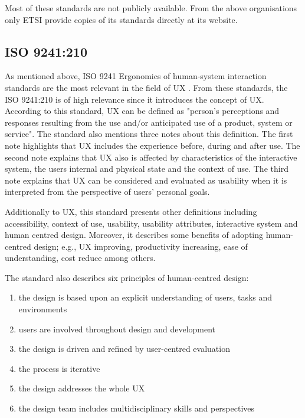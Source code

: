 Most of these standards are not publicly available. From the above organisations only \ac{ETSI} provide copies of its standards directly at its website.

\subsection{ISO 9241:210}
As mentioned above, ISO 9241 Ergonomics of human-system interaction standards are the most relevant in the field of \ac{UX} \autocite{Ran2015}. From these standards, the ISO 9241:210 \autocite{iso9241:210} is of high relevance since it introduces the concept of \ac{UX}. According to this standard, \ac{UX} can be defined as "person's perceptions and responses resulting from the use and/or anticipated use of a product, system or service". The standard also mentions three notes about this definition. The first note highlights that \ac{UX} includes the experience before, during and after use. The second note explains that \ac{UX} also is affected by characteristics of the interactive system, the users internal and physical state and the context of use. The third note explains that \ac{UX} can be considered and evaluated as usability when it is interpreted from the perspective of users' personal goals.

Additionally to \ac{UX}, this standard presents other definitions including accessibility, context of use, usability, usability attributes, interactive system and human centred design. Moreover, it describes some benefits of adopting human-centred design; e.g., \ac{UX} improving, productivity increasing, ease of understanding, cost reduce among others.

The standard also describes six principles of human-centred design:

\begin{enumerate}
    \item the design is based upon an explicit understanding of users, tasks and environments
    \item users are involved throughout design and development
    \item the design is driven and refined by user-centred evaluation
    \item the process is iterative
    \item the design addresses the whole \ac{UX}
    \item the design team includes multidisciplinary skills and perspectives
\end{enumerate}

